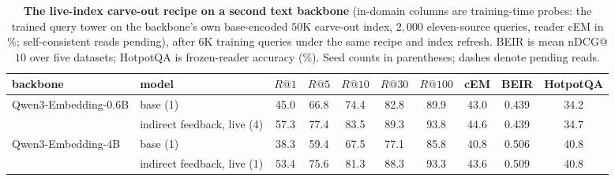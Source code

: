 \begin{table}[H]
\centering\small
\caption{\textbf{The live-index carve-out recipe on a second text backbone} (in-domain columns are training-time probes: the
trained query tower on the backbone's own base-encoded $50$K carve-out index, $2{,}000$ eleven-source queries, reader cEM in \%;
self-consistent reads pending), after $6$K training queries under the same recipe and index refresh. BEIR is mean nDCG@$10$ over five datasets; HotpotQA is frozen-reader accuracy (\%). Seed counts in
parentheses; dashes denote pending reads.}
\label{tab:rag_backbone_live}
\begin{tabular}{llcccccccc}
\toprule
backbone & model & $R@1$ & $R@5$ & $R@10$ & $R@30$ & $R@100$ & cEM & BEIR & HotpotQA \\
\midrule
Qwen3-Embedding-0.6B & base (1) & 45.0 & 66.8 & 74.4 & 82.8 & 89.9 & 43.0 & 0.439 & 34.2 \\
 & indirect feedback, live (4) & 57.3 & 77.4 & 83.5 & 89.3 & 93.8 & 44.6 & 0.439 & 34.7 \\
\midrule
Qwen3-Embedding-4B & base (1) & 38.3 & 59.4 & 67.5 & 77.1 & 85.8 & 40.8 & 0.506 & 40.8 \\
 & indirect feedback, live (1) & 53.4 & 75.6 & 81.3 & 88.3 & 93.3 & 43.6 & 0.509 & 40.8 \\
\bottomrule
\end{tabular}
\end{table}

